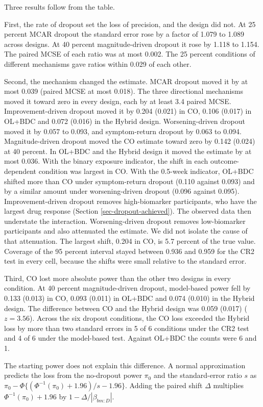 \documentclass[
  11pt,
]{article}
\begin{document}
Three results follow from the table.

First, the rate of dropout set the loss of precision, and the design
did not. At 25 percent MCAR dropout the standard error rose by a
factor of 1.079 to 1.089 across designs. At 40
percent magnitude-driven dropout it rose by 1.118 to
1.154. The paired MCSE of each ratio was at most
0.002.
The 25 percent conditions of different mechanisms gave ratios within
0.029
of each other.

Second, the mechanism changed the estimate. MCAR dropout moved it by
at most
0.039
(paired MCSE at most
0.018). The three
directional mechanisms moved it toward zero in every design, each by
at least 3.4 paired MCSE.
Improvement-driven dropout moved it by
0.204 (0.021)
in CO,
0.106 (0.017)
in OL+BDC and
0.072 (0.016)
in the Hybrid design. Worsening-driven dropout moved it by
0.057 to
0.093, and
symptom-return dropout by
0.063 to
0.094. Magnitude-driven
dropout moved the CO estimate toward zero by
0.142 (0.024)
at 40 percent. In OL+BDC and the Hybrid design it moved the estimate
by at most
0.036.
With the binary exposure indicator, the shift in each
outcome-dependent condition was largest in CO. With the 0.5-week
indicator, OL+BDC shifted more than CO under symptom-return dropout
(0.110 against
0.093) and by a similar
amount under worsening-driven dropout
(0.096 against
0.095).
Improvement-driven dropout removes high-biomarker participants, who
have the largest drug response (Section \ref{sec-dropout-achieved}).
The observed data then understate the interaction. Worsening-driven
dropout removes low-biomarker participants and also attenuated the
estimate. We did not isolate the cause of that attenuation. The largest
shift, 0.204 in CO,
is
5.7
percent of the true value. Coverage of the 95 percent interval stayed
between
0.936
and
0.959
for the CR2 test in every cell, because the shifts were small
relative to the standard error.

Third, CO lost more absolute power than the other two designs in every
condition. At 40 percent magnitude-driven dropout, model-based power
fell by
0.133 (0.013)
in CO,
0.093 (0.011)
in OL+BDC and
0.074 (0.010)
in the Hybrid design. The difference between CO and the Hybrid design
was
0.059 (0.017)
(\(z = 3.56\)).
Across the six dropout conditions, the CO loss exceeded the Hybrid
loss by more than two standard errors in 5
of 6 conditions under the CR2 test and
4 of 6 under the
model-based test. Against OL+BDC the counts were
6 and 1.

The starting power does not explain this difference. A normal
approximation predicts the loss from the no-dropout power \(\pi_0\) and
the standard-error ratio \(s\) as
\(\pi_0 - \Phi\{(\Phi^{-1}(\pi_0) + 1.96)/s - 1.96\}\). Adding the
paired shift \(\Delta\) multiplies \(\Phi^{-1}(\pi_0) + 1.96\) by
\(1 - \Delta/|\beta_{bm:D}|\).
\end{document}
